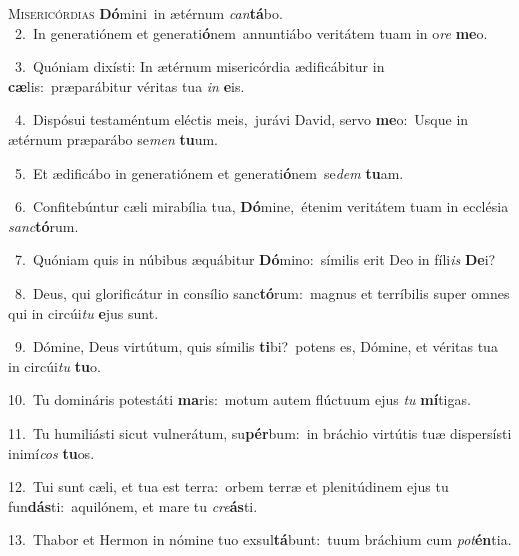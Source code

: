\lettrine{\initial\textcolor{\initialcolor}{M}}{isericórdias} \textbf{Dó}\-mini~\star in ætérnum \textit{can}\-\textbf{tá}bo.\\
{\numbfont\textcolor{\numbcolor}{~2.}}~In generatiónem et generati\-\textbf{ó}\-nem~\star annuntiábo veritátem tuam in o\textit{re} \textbf{me}\-o.\par
{\numbfont\textcolor{\numbcolor}{~3.}}~Quóniam dixísti: In ætérnum misericórdia ædificábitur in \textbf{cæ}\-lis:~\star præparábitur véritas tua \textit{in} \textbf{e}\-is.\par
{\numbfont\textcolor{\numbcolor}{~4.}}~Dispósui testaméntum eléctis meis,~\dagger jurávi David, servo \textbf{me}\-o:~\star Usque in ætérnum præparábo se\textit{men} \textbf{tu}\-um.\par
{\numbfont\textcolor{\numbcolor}{~5.}}~Et ædificábo in generatiónem et generati\-\textbf{ó}\-nem~\star se\textit{dem} \textbf{tu}\-am.\par
{\numbfont\textcolor{\numbcolor}{~6.}}~Confitebúntur cæli mirabília tua, \textbf{Dó}\-mine,~\star étenim veritátem tuam in ecclésia \textit{sanc}\-\textbf{tó}rum.\par
{\numbfont\textcolor{\numbcolor}{~7.}}~Quóniam quis in núbibus æquábitur \textbf{Dó}\-mino:~\star símilis erit Deo in fíli\textit{is} \textbf{De}\-i?\par
{\numbfont\textcolor{\numbcolor}{~8.}}~Deus, qui glorificátur in consílio sanc\-\textbf{tó}\-rum:~\star magnus et terríbilis super omnes qui in circúi\textit{tu} \textbf{e}\-jus sunt.\par
{\numbfont\textcolor{\numbcolor}{~9.}}~Dómine, Deus virtútum, quis símilis \textbf{ti}\-bi?~\star potens es, Dómine, et véritas tua in circúi\textit{tu} \textbf{tu}\-o.\par
{\numbfont\textcolor{\numbcolor}{10.}}~Tu domináris potestáti \textbf{ma}\-ris:~\star motum autem flúctuum ejus \textit{tu} \textbf{mí}\-tigas.\par
{\numbfont\textcolor{\numbcolor}{11.}}~Tu humiliásti sicut vulnerátum, su\-\textbf{pér}\-bum:~\star in bráchio virtútis tuæ dispersísti inimí\textit{cos} \textbf{tu}\-os.\par
{\numbfont\textcolor{\numbcolor}{12.}}~Tui sunt cæli, et tua est terra:~\dagger orbem terræ et plenitúdinem ejus tu fun\-\textbf{dás}\-ti:~\star aquilónem, et mare tu \textit{cre}\-\textbf{ás}ti.\par
{\numbfont\textcolor{\numbcolor}{13.}}~Thabor et Hermon in nómine tuo exsul\-\textbf{tá}\-bunt:~\star tuum bráchium cum \textit{pot}\-\textbf{én}tia.\par
